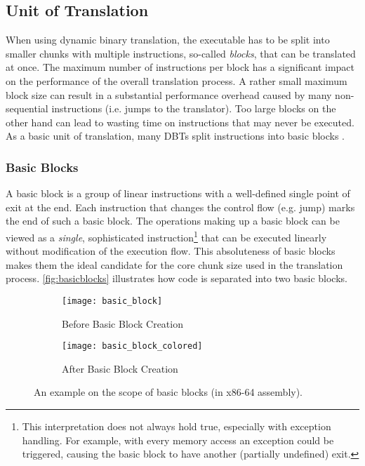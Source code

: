 
\subsection{Unit of Translation}
\label{blocks}
	When using dynamic binary translation, the executable has to be split into smaller chunks with multiple instructions, so-called \emph{blocks}, that can be translated at once. The maximum number of instructions per block has a significant impact on the performance of the overall translation process. A rather small maximum block size can result in a substantial performance overhead caused by many non-sequential instructions (i.e. jumps to the translator). Too large blocks on the other hand can lead to wasting time on instructions that may never be executed. As a basic unit of translation, many DBTs split instructions into basic blocks \cite{qemu-conference-paper, arm-binary-translator}.

	\subsubsection{Basic Blocks} %
		A basic block is a group of linear instructions with a well-defined single point of exit at the end. Each instruction that changes the control flow (e.g. jump) marks the end of such a basic block. The operations making up a basic block can be viewed as a \emph{single}, sophisticated instruction\footnote{This interpretation does not always hold true, especially with exception handling. For example, with every memory access an exception could be triggered, causing the basic block to have another (partially undefined) exit.} that can be executed linearly without modification of the execution flow. This absoluteness of basic blocks makes them the ideal candidate for the core chunk size used in the translation process. \autoref{fig:basicblocks} illustrates how code is separated into two basic blocks. 

		\begin{figure}[htb]
			\begin{subfigure}[b]{.5\textwidth}
				\centering
				\texttt{[image: basic\_block]}
				\caption{Before Basic Block Creation}
				\label{fig:basicblocks-before}
			\end{subfigure}
			\begin{subfigure}[b]{.5\textwidth}
				\centering
				\texttt{[image: basic\_block\_colored]}
				\caption{After Basic Block Creation}
				\label{fig:basicblocks-after}
			\end{subfigure}

			\caption[Basic Block Separation]{An example on the scope of basic blocks (in x86-64 assembly).}
			\label{fig:basicblocks}
		\end{figure}

